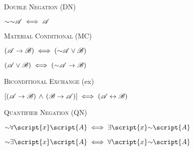 {\begin{multicols}{2}
\noindent\textsc{Double Negation} (DN)
\begin{earg}
\item[] $\mathord{\sim}\mathord{\sim}\mathscr{A} \iff \mathscr{A}$
\end{earg}

\noindent\textsc{Material Conditional} (MC)
\begin{earg}
\item[] $(\mathscr{A}\rightarrow\mathscr{B}) \iff (\mathord{\sim}\mathscr{A}\lor\mathscr{B})$\\
\item[] $(\mathscr{A}\lor\mathscr{B}) \iff (\mathord{\sim}\mathscr{A}\rightarrow\mathscr{B})$
\end{earg}

\noindent\textsc{Biconditional Exchange} ({\eiff}{ex})\\
\begin{earg}
\item[] $[(\mathscr{A}\rightarrow\mathscr{B})\,\land\,(\mathscr{B}\rightarrow\mathscr{A})] \iff (\mathscr{A}\leftrightarrow\mathscr{B})$
\end{earg}

\noindent\textsc{Quantifier Negation} (QN)\\
\begin{earg}
\item[] $\enot\forall\script{x}\script{A} \iff \exists\script{x}\enot\script{A}$\\
\item[] $\enot\exists\script{x}\script{A} \iff \forall\script{x}\enot\script{A}$
\end{earg}

\end{multicols}
}{}

